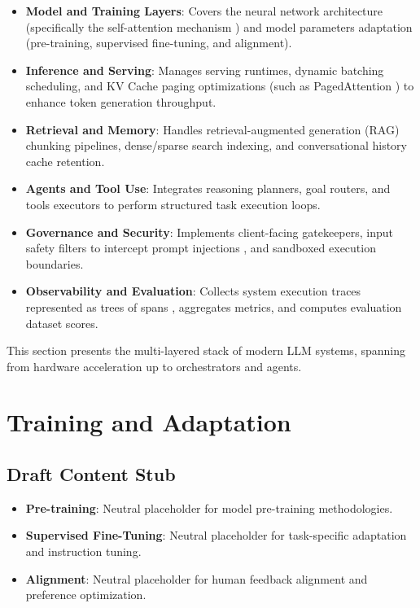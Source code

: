 \documentclass[11pt]{article}
\begin{document}
\begin{itemize}
  \item \textbf{Model and Training Layers}: Covers the neural network architecture (specifically the self-attention mechanism \cite{source-attention-2017}) and model parameters adaptation (pre-training, supervised fine-tuning, and alignment).
  \item \textbf{Inference and Serving}: Manages serving runtimes, dynamic batching scheduling, and KV Cache paging optimizations (such as PagedAttention \cite{source-kv-cache-2023}) to enhance token generation throughput.
  \item \textbf{Retrieval and Memory}: Handles retrieval-augmented generation (RAG) chunking pipelines, dense/sparse search indexing, and conversational history cache retention.
  \item \textbf{Agents and Tool Use}: Integrates reasoning planners, goal routers, and tools executors to perform structured task execution loops.
  \item \textbf{Governance and Security}: Implements client-facing gatekeepers, input safety filters to intercept prompt injections \cite{source-adversarial-2024}, and sandboxed execution boundaries.
  \item \textbf{Observability and Evaluation}: Collects system execution traces represented as trees of spans \cite{source-dapper-2010}, aggregates metrics, and computes evaluation dataset scores.
\end{itemize}

This section presents the multi-layered stack of modern LLM systems, spanning from hardware acceleration up to orchestrators and agents.

\section{Training and Adaptation}

\subsection{Draft Content Stub}

\begin{itemize}
  \item \textbf{Pre-training}: Neutral placeholder for model pre-training methodologies.
  \item \textbf{Supervised Fine-Tuning}: Neutral placeholder for task-specific adaptation and instruction tuning.
  \item \textbf{Alignment}: Neutral placeholder for human feedback alignment and preference optimization.
\end{itemize}
\end{document}
